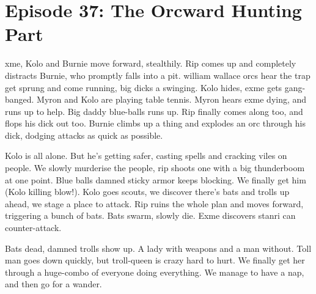 \section{Episode 37: The Orcward Hunting Part}

\begin{multicols}{2}

xme, Kolo and Burnie move forward, stealthily. Rip comes up and completely distracts Burnie, who promptly falls into a pit. william wallace orcs hear the trap get sprung and come running, big dicks a swinging. Kolo hides, exme gets gang-banged. Myron and Kolo are playing table tennis. Myron hears exme dying, and runs up to help. Big daddy blue-balls runs up. Rip finally comes along too, and flops his dick out too. Burnie climbs up a thing and explodes an orc through his dick, dodging attacks as quick as possible.\medskip

Kolo is all alone. But he’s getting safer, casting spells and cracking viles on people. We slowly murderise the people, rip shoots one with a big thunderboom at one point. Blue balls damned sticky armor keeps blocking. We finally get him (Kolo killing blow!). Kolo goes scouts, we discover there’s bats and trolls up ahead, we stage a place to attack. Rip ruins the whole plan and moves forward, triggering a bunch of bats. Bats swarm, slowly die. Exme discovers stanri can counter-attack.\medskip

Bats dead, damned trolls show up. A lady with weapons and a man without. Toll man goes down quickly, but troll-queen is crazy hard to hurt. We finally get her through a huge-combo of everyone doing everything. We manage to have a nap, and then go for a wander.

\end{multicols}

\vspace*{5mm}

